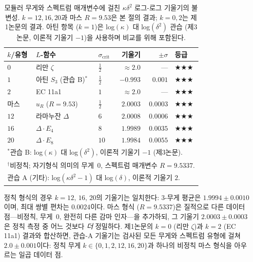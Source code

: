 \documentclass[11pt, a4paper]{article}
\theoremstyle{plain}
\theoremstyle{definition}
\begin{document}
\begin{table}[ht]
\centering
\caption{모듈러 무게와 스펙트럼 매개변수에 걸친 $\kappa\delta^{2}$
  로그-로그 기울기의 불변성.
  $k=12,16,20$과 마스 $R=9.53$은 본 절의 결과; $k=0,2$는 제1논문의 결과.
  아틴 항목 ($k=1$)은 log$(\kappa)$ 대 log$(\delta^2)$ 관습
  (제3논문, 이론적 기울기 $-1$)을 사용하며 비교를 위해 포함된다.}
\label{tab:weightuniv}
\small
\begin{tabular}{lllrrl}
\toprule
$k$/유형 & $L$-함수 & $\sigma_{\mathrm{crit}}$ & 기울기 & $\pm\sigma$ & 등급 \\
\midrule
$0$  & 리만 $\zeta$ & $\tfrac{1}{2}$ & $\approx 2.0$ & --- & $\bigstar\bigstar\bigstar$ \\
$1$  & 아틴 $S_3$ (관습 B)$^{*}$ & $\tfrac{1}{2}$ & $-0.993$ & $0.001$ & $\bigstar\bigstar\bigstar$ \\
$2$  & EC 11a1 & $1$ & $\approx 2.0$ & --- & $\bigstar\bigstar\bigstar$ \\
마스 & $u_{R}$ ($R{=}9.53$) & $\tfrac{1}{2}$ & $\mathbf{2.0003}$ & $\mathbf{0.0003}$ & $\bigstar\bigstar\bigstar$ \\
$12$ & 라마누잔 $\Delta$ & $6$ & $2.0008$ & $0.0006$ & $\bigstar\bigstar\bigstar$ \\
$16$ & $\Delta\cdot E_4$ & $8$ & $1.9989$ & $0.0035$ & $\bigstar\bigstar\bigstar$ \\
$20$ & $\Delta\cdot E_8$ & $10$ & $1.9984$ & $0.0055$ & $\bigstar\bigstar\bigstar$ \\
\bottomrule
\multicolumn{6}{l}{\small $^{*}$관습 B: log$(\kappa)$ 대 log$(\delta^2)$, 이론적 기울기 $-1$ (제3논문).} \\
\multicolumn{6}{l}{\small $^{\dagger}$비정칙; 자기형식 의미의 무게~$0$, 스펙트럼 매개변수 $R=9.5337$.} \\
\multicolumn{6}{l}{\small 관습 A (기타): log$(\kappa\delta^2-1)$ 대 log$(\delta)$, 이론적 기울기 $2$.} \\
\end{tabular}
\end{table}

정칙 형식의 경우 $k=12$, $16$, $20$의 기울기는 일치한다: 3-무게 평균은
$1.9994\pm 0.0010$이며, 최대 쌍별 편차는 $0.0024$이다.
마스 형식 ($R=9.5337$)은 질적으로 다른 데이터 점---비정칙, 무게~$0$,
완전히 다른 감마 인자---을 추가하되, 그 기울기 $2.0003\pm 0.0003$은
정칙 측정 중 어느 것보다 \emph{더} 정밀하다.
제1논문의 $k=0$ (리만 $\zeta$)과 $k=2$ (EC 11a1) 결과와 합산하면,
관습-A 기울기는 검사된 모든 무게와 스펙트럼 유형에 걸쳐 $2.0\pm 0.001$이다:
정칙 무게 $k\in\{0,1,2,12,16,20\}$과 하나의 비정칙 마스 형식을 아우르는
일곱 데이터 점.
\end{document}
